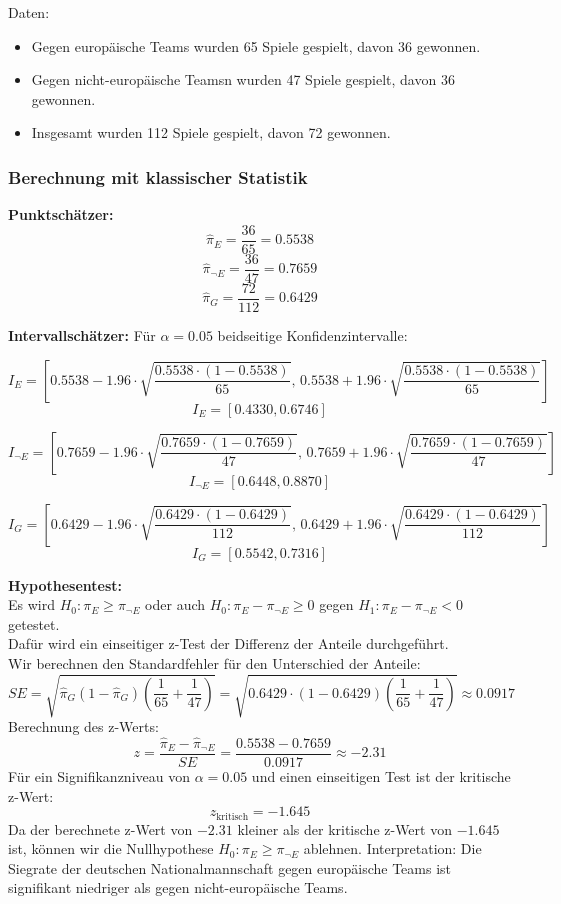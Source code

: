 \documentclass[a4paper,12pt]{article}
\begin{document}
Daten:
\begin{itemize}
  \item Gegen europäische Teams wurden 65 Spiele gespielt, davon 36 gewonnen.
  \item Gegen nicht-europäische Teamsn wurden 47 Spiele gespielt, davon 36 gewonnen.
  \item Insgesamt wurden 112 Spiele gespielt, davon 72 gewonnen.
\end{itemize}

\subsubsection{Berechnung mit klassischer Statistik}
\textbf{Punktschätzer:}
\[
\hat{\pi}_E = \frac{36}{65} = 0.5538
\]
\[
\hat{\pi}_{\neg E} = \frac{36}{47} = 0.7659
\]
\[
\hat{\pi}_G = \frac{72}{112} = 0.6429
\]

\textbf{Intervallschätzer:}
Für \(\alpha = 0.05\) beidseitige Konfidenzintervalle:

\[
I_E = \left[ 0.5538 - 1.96 \cdot \sqrt{\frac{0.5538 \cdot (1-0.5538)}{65}}, \, 0.5538 + 1.96 \cdot \sqrt{\frac{0.5538 \cdot (1-0.5538)}{65}} \right]
\]
\[
I_E = [0.4330, 0.6746]
\]

\[
I_{\neg E} = \left[ 0.7659 - 1.96 \cdot \sqrt{\frac{0.7659 \cdot (1-0.7659)}{47}}, \, 0.7659 + 1.96 \cdot \sqrt{\frac{0.7659 \cdot (1-0.7659)}{47}} \right]
\]
\[
I_{\neg E} = [0.6448, 0.8870]
\]

\[
I_G = \left[ 0.6429 - 1.96 \cdot \sqrt{\frac{0.6429 \cdot (1-0.6429)}{112}}, \, 0.6429 + 1.96 \cdot \sqrt{\frac{0.6429 \cdot (1-0.6429)}{112}} \right]
\]
\[
I_G = [0.5542, 0.7316]
\]

\textbf{Hypothesentest:} \\
Es wird \(H_0 : \pi_E \geq \pi_{\neg E}\) oder auch \(H_0 : \pi_E - \pi_{\neg E} \geq 0\) gegen \(H_1 : \pi_E - \pi_{\neg E} < 0\) getestet. \\
Dafür wird ein einseitiger z-Test der Differenz der Anteile durchgeführt. \\

Wir berechnen den Standardfehler für den Unterschied der Anteile:
\[
SE = \sqrt{\hat{\pi}_G(1 - \hat{\pi}_G) \left(\frac{1}{65} + \frac{1}{47}\right)} = \sqrt{0.6429 \cdot (1 - 0.6429) \left(\frac{1}{65} + \frac{1}{47}\right)} \approx 0.0917
\]
Berechnung des z-Werts:
\[
z = \frac{\hat{\pi}_E - \hat{\pi}_{\neg E}}{SE} = \frac{0.5538 - 0.7659}{0.0917} \approx -2.31
\]
Für ein Signifikanzniveau von \( \alpha = 0.05 \) und einen einseitigen Test ist der kritische z-Wert:
\[
z_{\text{kritisch}} = -1.645
\]
Da der berechnete z-Wert von \(-2.31\) kleiner als der kritische z-Wert von \(-1.645\) ist, können wir die Nullhypothese \( H_0 : \pi_E \geq \pi_{\neg E} \) ablehnen.
Interpretation: Die Siegrate der deutschen Nationalmannschaft gegen europäische Teams ist signifikant niedriger als gegen nicht-europäische Teams.
\end{document}
